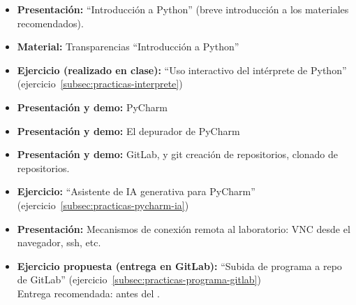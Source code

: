 \documentclass[a4paper,12pt]{article}
\begin{document}
\begin{itemize}
\item \textbf{Presentación:} ``Introducción a Python'' (breve introducción a los materiales recomendados).
\item \textbf{Material:} Transparencias ``Introducción a Python''
\item \textbf{Ejercicio (realizado en clase):} ``Uso interactivo del intérprete de Python'' (ejercicio~\ref{subsec:practicas-interprete})
\item \textbf{Presentación y demo:} PyCharm
\item \textbf{Presentación y demo:} El depurador de PyCharm
\item \textbf{Presentación y demo:} GitLab, y git creación de repositorios, clonado de repositorios.
\item \textbf{Ejercicio:} ``Asistente de IA generativa para PyCharm'' (ejercicio~\ref{subsec:practicas-pycharm-ia})
\item \textbf{Presentación:} Mecanismos de conexión remota al laboratorio: VNC desde el navegador, ssh, etc.
\item \textbf{Ejercicio propuesta (entrega en GitLab):} ``Subida de programa a repo de GitLab'' (ejercicio~\ref{subsec:practicas-programa-gitlab}) \\
   Entrega recomendada: antes del \juevesC.

\end{itemize}

\end{document}
